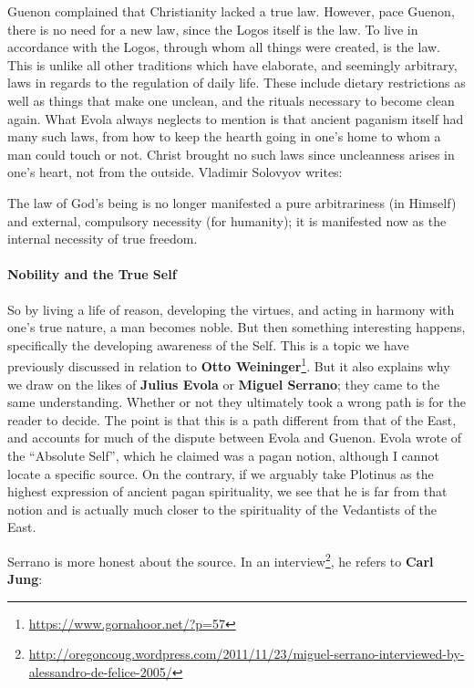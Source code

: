 Guenon complained that Christianity lacked a true law. However, pace Guenon, there is no need for a new law, since the Logos itself is the law. To live in accordance with the Logos, through whom all things were created, is the law. This is unlike all other traditions which have elaborate, and seemingly arbitrary, laws in regards to the regulation of daily life. These include dietary restrictions as well as things that make one unclean, and the rituals necessary to become clean again. What Evola always neglects to mention is that ancient paganism itself had many such laws, from how to keep the hearth going in one's home to whom a man could touch or not. Christ brought no such laws since uncleanness arises in one's heart, not from the outside. Vladimir Solovyov writes:

\begin{quotex}
The law of God's being is no longer manifested a pure arbitrariness (in Himself) and external, compulsory necessity (for humanity); it is manifested now as the internal necessity of true freedom.

\end{quotex}
\paragraph{Nobility and the True Self}
So by living a life of reason, developing the virtues, and acting in harmony with one's true nature, a man becomes noble. But then something interesting happens, specifically the developing awareness of the Self. This is a topic we have previously discussed in relation to \textbf{Otto Weininger}\footnote{\url{https://www.gornahoor.net/?p=57}}. But it also explains why we draw on the likes of \textbf{Julius Evola} or \textbf{Miguel Serrano}; they came to the same understanding. Whether or not they ultimately took a wrong path is for the reader to decide. The point is that this is a path different from that of the East, and accounts for much of the dispute between Evola and Guenon. Evola wrote of the “Absolute Self”, which he claimed was a pagan notion, although I cannot locate a specific source. On the contrary, if we arguably take Plotinus as the highest expression of ancient pagan spirituality, we see that he is far from that notion and is actually much closer to the spirituality of the Vedantists of the East.

Serrano is more honest about the source. In an interview\footnote{\url{http://oregoncoug.wordpress.com/2011/11/23/miguel-serrano-interviewed-by-alessandro-de-felice-2005/}}, he refers to \textbf{Carl Jung}:

